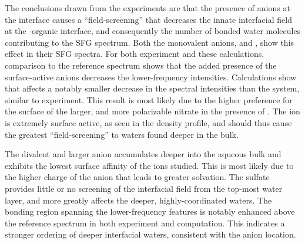 The conclusions drawn from the experiments are that the presence of anions at the interface causes a ``field-screening'' that decreases the innate interfacial field at the \wat-organic interface, and consequently the number of bonded water molecules contributing to the SFG spectrum. Both the monovalent anions, \cl and \nit, show this effect in their SFG spectra. For both experiment and these calculations, comparison to the reference \ctcwat spectrum shows that the added presence of the surface-active anions decreases the lower-frequency intensities. Calculations show that \cl affects a notably smaller decrease in the spectral intensities than the \nit system, similar to experiment. This result is most likely due to the higher preference for the surface of the larger, and more polarizable nitrate in the presence of \ctc. The \nit ion is extremely surface active, as seen in the density profile, and should thus cause the greatest ``field-screening'' to waters found deeper in the bulk.

The divalent and larger \sul anion accumulates deeper into the aqueous bulk and exhibits the lowest surface affinity of the ions studied. This is most likely due to the higher charge of the anion that leads to greater solvation. The sulfate provides little or no screening of the interfacial field from the top-most water layer, and more greatly affects the deeper, highly-coordinated waters. The bonding region spanning the lower-frequency features is notably enhanced above the reference spectrum in both experiment and computation. This indicates a stronger ordering of deeper interfacial waters, consistent with the anion location.

